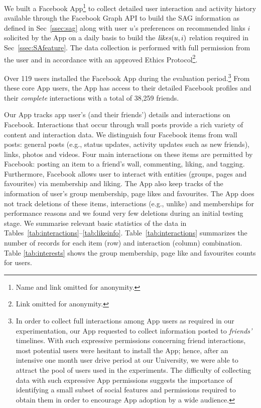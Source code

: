 
We built a Facebook App\footnote{Name and link omitted
for anonymity.} to collect detailed user
interaction and activity history available through the Facebook Graph
API to build the SAG information as defined in Sec~\ref{ssec:sag}
along with user $u$'s preferences on recommended links $i$ solicited by the App on a daily basis
to build the $\likes(u,i)$ relation required in Sec~\ref{ssec:SAfeature}.
The data collection is performed with full permission from the user and in
accordance with an approved Ethics Protocol\footnote{Link omitted for
anonymity.}.

Over 119 users installed the Facebook App during the evaluation
period.\footnote{In order to collect full interactions among App users
as required in our experimentation, our App requested to collect
information posted to \emph{friends'} timelines.  With such expressive
permissions concerning friend interactions, most potential users were
hesitant to install the App; hence, after an intensive one month user drive period
at our University, we were able to attract the pool of users used in the experiments.  The difficulty
of collecting data with such expressive App permissions suggests the importance
of identifying a small subset of social features and permissions required to 
obtain them in order to encourage App adoption by a wide audience.}
From these core App users, the App has access to their detailed
Facebook profiles and their \emph{complete} interactions with a total of 38,259
friends.

Our App tracks app user's (and their friends') details and
interactions on Facebook.  Interactions that occur through wall posts
provide a rich variety of content and interaction data.  We
distinguish four Facebook items from wall posts: general posts (e.g.,
status updates, activity updates such as new friends), links, photos
and videos. Four main interactions on these items are permitted by
Facebook: posting an item to a friend's wall, commenting, liking, and
tagging. Furthermore, Facebook allows user to interact with entities
(groups, pages and favourites) via membership and liking. The App also
keep tracks of the information of user's group membership, page likes
and favourites.  The App does not track deletions of these items,
interactions (e.g., unlike) and memberships for performance reasons
and we found very few deletions during an initial testing stage.  We
summarise relevant basic statistics of the data in
Tables~\ref{tab:interactions}--\ref{tab:likeinfo}.
Table~\ref{tab:interactions} summarizes the number of records for each
item (row) and interaction (column)
combination. Table \ref{tab:interests} shows the group membership,
page like and favourites counts for users.


